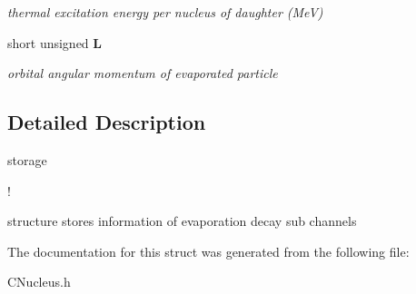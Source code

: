 \begin{CompactItemize}
\begin{CompactList}\small\item\em thermal excitation energy per nucleus of daughter (Me\-V) \item\end{CompactList}\item 
short unsigned \bf{L}\label{structSStoreChan_1632f5dca77a30fb9b14a6a572e19eed}

\begin{CompactList}\small\item\em orbital angular momentum of evaporated particle \item\end{CompactList}\end{CompactItemize}


\subsection{Detailed Description}
storage 

!

structure stores information of evaporation decay sub channels 



The documentation for this struct was generated from the following file:\begin{CompactItemize}
\item 
CNucleus.h\end{CompactItemize}
